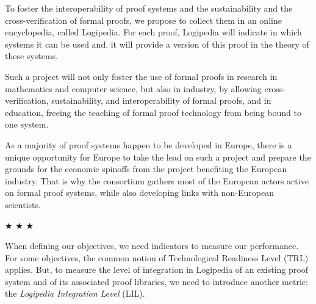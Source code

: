 To foster the interoperability of proof systems and the sustainability
and the cross-verification of formal proofs, we propose to collect
them in an online encyclopedia, called Logipedia.  For each proof,
Logipedia will indicate in which systems it can be used and, it will
provide a version of this proof in the theory of these systems.

Such a project will not only foster the use of formal proofs in
research in mathematics and computer science, but also in industry, by
allowing cross-verification, sustainability, and interoperability of
formal proofs, and in education, freeing the teaching of formal proof
technology from being bound to one system.

As a
majority of proof systems happen to be developed in Europe, there is a unique
opportunity for Europe to take the lead on such a project and prepare
the grounds for the economic spinoffs from the project benefiting
the European industry. That is why the consortium gathers most of the
European actors active on formal proof systems, while also developing
links with non-European scientists.

\begin{center}
$\bigstar$ $\bigstar$ $\bigstar$
\end{center}

When defining our objectives, we need indicators to measure our
performance. For some objectives, the common notion of Technological
Readiness Level (TRL) applies. But, to measure the level of integration
in Logipedia of an existing proof system and of its associated proof
libraries, we need to introduce another metric: the {\em Logipedia
  Integration Level} (LIL).

